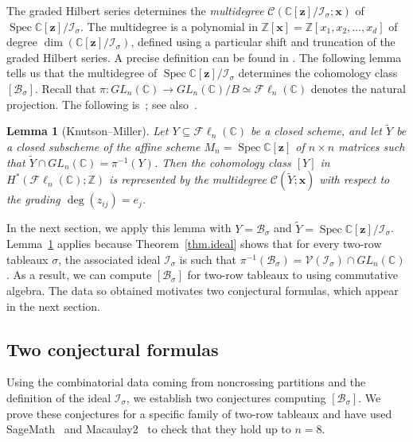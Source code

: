 \documentclass[11pt]{amsart}
\newtheorem{lemma}[theorem]{Lemma}
\theoremstyle{remark}
\theoremstyle{remark}
\theoremstyle{definition}
\theoremstyle{definition}
\theoremstyle{definition}
\numberwithin{equation}{section}
\newcommand{\C}{\mathbb{C}}           %
\newcommand{\Z}{\mathbb{ Z}}           %
\newcommand{\spec}{\operatorname{Spec}}
\newcommand{\gs}{\sigma}
\newcommand{\cb}{\mathcal{B}}
\newcommand{\cc}{\mathcal{C}}
\newcommand{\ci}{\mathcal{I}}
\newcommand{\cv}{\mathcal{V}}
\newcommand{\SF}{\mathcal{B}}
\newcommand{\isigma}{\ci_\gs}
\newcommand{\Fl}{\mathcal{F}\ell}
\begin{document}
The graded Hilbert series determines the \emph{multidegree} $\cc(\C[\mathbf{z}]/\ci_\gs; \mathbf{x})$ of $\spec \C[\mathbf{z}]/\ci_\gs$. The multidegree is a polynomial in $\mathbb{Z}[\mathbf{x}]=\mathbb{Z}\left[x_1, x_2, \ldots, x_d\right]$ of degree $\dim \left(\C[\mathbf{z}]/\ci_\gs\right)$, defined using a particular shift and truncation of the graded Hilbert series. A precise definition can be found in \cite[\S 8.5]{MillerSturmfels2005}. The following lemma tells us that the multidegree of $\spec \C[\mathbf{z}]/\ci_\gs$ determines the cohomology class $[\cb_\gs]$. Recall that $\pi: GL_n(\C) \rightarrow GL_n(\C) / B\simeq \Fl_n(\C)$ denotes the natural projection. The following is~\cite[Corollary 2.3.1]{KnutsonMiller2005}; see also~\cite[Proposition 3]{ITW18}.


\begin{lemma}[Knutson--Miller]\label{lemma.multidegree} Let $Y \subseteq \Fl_n(\C)$ be a closed scheme, and let $\tilde{Y}$ be a closed subscheme of the affine scheme $M_n=\spec \mathbb{C}[\mathbf{z}]$ of $n \times n$ matrices such that $\tilde{Y} \cap GL_n(\C)=\pi^{-1}(Y)$. Then the cohomology class $[Y]$ in $H^*(\Fl_n(\C);\Z)$ is represented by the multidegree $\cc(\tilde{Y};\mathbf{x})$ with respect to the grading $\operatorname{deg}\left(z_{i j}\right)=e_j$.
\end{lemma}

In the next section, we apply this lemma with $Y=\cb_\gs$ and $\tilde{Y} = \spec \C[\mathbf{z}] / \ci_\gs$. Lemma~\ref{lemma.multidegree} applies because Theorem~\ref{thm.ideal} shows that for every two-row tableaux $\gs$, the associated ideal $\isigma$ is such that $\pi^{-1}(\cb_{\gs}) = \cv(\ci_{\gs})\cap GL_n(\C)$. As a result, we can compute $[\cb_\gs]$ for two-row tableaux to using commutative algebra. The data so obtained motivates two conjectural formulas, which appear in the next section.














\subsection{Two conjectural formulas}
Using the combinatorial data coming from noncrossing partitions and the definition of the ideal $\ci_\gs$, we establish two conjectures computing $[\SF_\gs]$. We prove these conjectures for a specific family of two-row tableaux and have used SageMath~\cite{sagemath} and Macaulay2~\cite{M2} to check that they hold up to $n=8$. 
\end{document}
